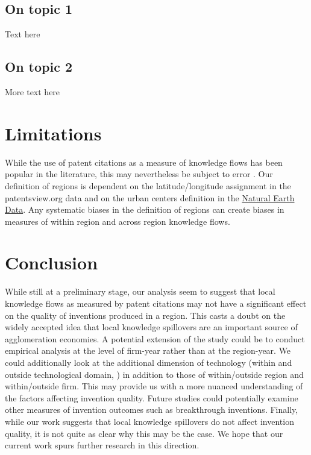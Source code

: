 \documentclass[12pt,letterpaper]{article}
\begin{document}
\subsection{On topic 1}
Text here
\subsection{On topic 2}
More text here

\section*{Limitations}
While the use of patent citations as a measure of knowledge flows has been popular in the literature, this may nevertheless be subject to error \citep*{Arora2017a}. Our definition of regions is dependent on the latitude/longitude assignment in the patentsview.org data and on the urban centers definition in the \href{http://www.naturalearthdata.com/downloads/10m-cultural-vectors/}{Natural Earth Data}. Any systematic biases in the definition of regions can create biases in measures of within region and across region knowledge flows. \par

\section*{Conclusion}
While still at a preliminary stage, our analysis seem to suggest that local knowledge flows as measured by patent citations may not have a significant effect on the quality of inventions produced in a region. This casts a doubt on the widely accepted idea that local knowledge spillovers are an important source of agglomeration economies. A potential extension of the study could be to conduct empirical analysis at the level of firm-year rather than at the region-year. We could additionally look at the additional dimension of technology (within and outside technological domain, \cite{Rosenkopf2001}) in addition to those of within/outside region and within/outside firm. This may provide us with a more nuanced understanding of the factors affecting invention quality. Future studies could potentially examine other measures of invention outcomes such as breakthrough inventions. Finally, while our work suggests that local knowledge spillovers do not affect invention quality, it is not quite as clear why this may be the case. We hope that our current work spurs further research in this direction.  

\renewcommand{\refname}{REFERENCES}
 

\newpage
\singlespacing
\scriptsize

\newpage

\newpage

\end{document}
